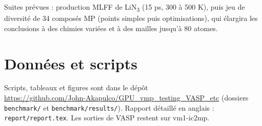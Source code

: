 \documentclass[11pt,a4paper]{article}
\begin{document}
Suites prévues : production MLFF de LiN\textsubscript{3} (15 ps, 300 à 500 K), puis jeu de
diversité de 34 composés MP (points simples puis optimisations), qui élargira les conclusions
à des chimies variées et à des mailles jusqu'à 80 atomes.

\section*{Données et scripts}
Scripts, tableaux et figures sont dans le dépôt\\
\url{https://github.com/John-Akapulco/GPU_vmp_testing_VASP_etc} (dossiers \texttt{benchmark/}
et \texttt{benchmark/results/}). Rapport détaillé en anglais : \texttt{report/report.tex}.
Les sorties de VASP restent sur vm1-ic2mp.
\end{document}
